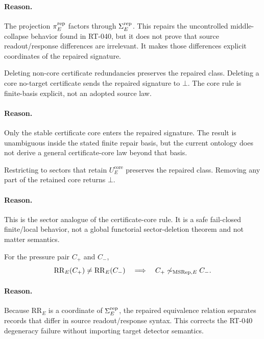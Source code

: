 \paragraph{Reason.}
The projection \(\pi^{\mathrm{rep}}_E\) factors through \(\Sigma^{\mathrm{rep}}_E\). This repairs the
uncontrolled middle-collapse behavior found in RT-040, but it does not prove
that source readout/response differences are irrelevant. It makes those
differences explicit coordinates of the repaired signature.

\begin{proposition}
Deleting non-core certificate redundancies preserves the repaired class.
Deleting a core no-target certificate sends the repaired signature to
\(\bot\). The core rule is finite-basis explicit, not an adopted source law.
\end{proposition}

\paragraph{Reason.}
Only the stable certificate core enters the repaired signature. The result is
unambiguous inside the stated finite repair basis, but the current ontology
does not derive a general certificate-core law beyond that basis.

\begin{proposition}
Restricting to sectors that retain \(U_E^{\mathrm{core}}\) preserves the
repaired class. Removing any part of the retained core returns \(\bot\).
\end{proposition}

\paragraph{Reason.}
This is the sector analogue of the certificate-core rule. It is a safe
fail-closed finite/local behavior, not a global functorial sector-deletion
theorem and not matter semantics.

\begin{proposition}
For the pressure pair \(C_+\) and \(C_-\),
\[
  \mathrm{RR}_E(C_+)\neq\mathrm{RR}_E(C_-)
  \quad\Longrightarrow\quad
  C_+\not\mathrel{\sim_{\mathrm{MSRep},E}}C_-.
\]
\end{proposition}

\paragraph{Reason.}
Because \(\mathrm{RR}_E\) is a coordinate of \(\Sigma^{\mathrm{rep}}_E\), the repaired
equivalence relation separates records that differ in source readout/response
syntax. This corrects the RT-040 degeneracy failure without importing target
detector semantics.

